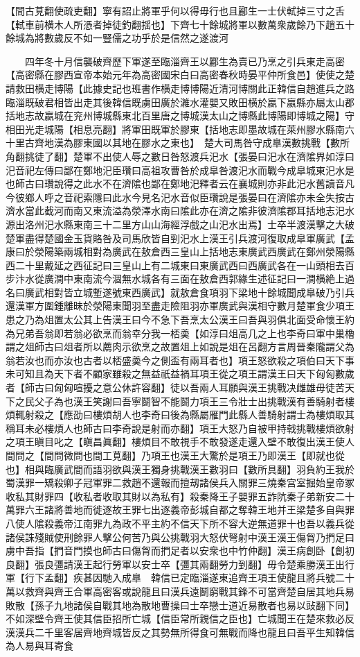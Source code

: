 【間古莧翻使疏吏翻】寧有詔止將軍乎何以得毋行也且酈生一士伏軾掉三寸之舌【軾車前横木人所憑者掉徒釣翻揺也】下齊七十餘城將軍以數萬衆歲餘乃下趙五十餘城為將數歲反不如一豎儒之功乎於是信然之遂渡河

　　四年冬十月信襲破齊歷下軍遂至臨淄齊王以酈生為賣已乃烹之引兵東走高密【高密縣在膠西宣帝本始元年為高密國宋白曰高密春秋時晏平仲所食邑】使使之楚請救田横走博陽【此據史記也班書作横走博博陽近清河博關此正韓信自趙進兵之路臨淄既破君相皆出走其後韓信既虜田廣於濰水灌嬰又敗田横於嬴下嬴縣亦屬太山郡括地志故嬴城在兖州博城縣東北百里唐之博城漢太山之博縣此博陽即博城之陽】守相田光走城陽【相息亮翻】將軍田既軍於膠東【括地志即墨故城在萊州膠水縣南六十里古齊地漢為膠東國以其地在膠水之東也】　楚大司馬咎守成臯漢數挑戰【數所角翻挑徒了翻】楚軍不出使人辱之數日咎怒渡兵汜水【張晏曰汜水在濟隂界如淳曰汜音祀左傳曰鄙在鄭地汜臣瓚曰高祖攻曹咎於成臯咎渡汜水而戰今成臯城東汜水是也師古曰瓚說得之此水不在濟隂也鄙在鄭地汜釋者云在襄城則亦非此汜水舊讀音凡今彼鄉人呼之音祀索隱曰此水今見名汜水音似臣瓚說是張晏曰在濟隂亦未全失按古濟水當此截河而南又東流溢為滎澤水南曰隂此亦在濟之隂非彼濟隂郡耳括地志汜水源出洛州汜水縣東南三十二里方山山海經浮戲之山汜水出焉】士卒半渡漢擊之大破楚軍盡得楚國金玉貨賂咎及司馬欣皆自剄汜水上漢王引兵渡河復取成臯軍廣武【孟康曰於滎陽築兩城相對為廣武在敖倉西三皇山上括地志東廣武西廣武在鄭州滎陽縣西二十里戴延之西征記曰三皇山上有二城東曰東廣武西曰西廣武各在一山頭相去百步汴水從廣澗中東南流今涸無水城各有三面在敖倉西郭緣生述征記曰一澗横絶上過名曰廣武相對皆立城塹遂號東西廣武】就敖倉食項羽下梁地十餘城聞成臯破乃引兵還漢軍方圍鍾離昧於滎陽東聞羽至盡走險阻羽亦軍廣武與漢相守數月楚軍食少項王患之乃為俎置太公其上告漢王曰今不急下吾烹太公漢王曰吾與羽俱北面受命懷王約為兄弟吾翁即若翁必欲烹而翁幸分我一桮羮【如淳曰俎高几之上也李奇曰軍中巢櫓謂之俎師古曰俎者所以薦肉示欲烹之故置俎上如說是俎在呂翻方言周晉秦隴謂父為翁若汝也而亦汝也古者以桮盛羮今之側盃有兩耳者也】項王怒欲殺之項伯曰天下事未可知且為天下者不顧家雖殺之無益祇益禍耳項王從之項王謂漢王曰天下匈匈數歲者【師古曰匈匈喧擾之意公休許容翻】徒以吾兩人耳願與漢王挑戰决雌雄毋徒苦天下之民父子為也漢王笑謝曰吾寧鬬智不能鬬力項王三令壯士出挑戰漢有善騎射者樓煩輒射殺之【應劭曰樓煩胡人也李奇曰後為縣屬雁門此縣人善騎射謂士為樓煩取其稱耳未必樓煩人也師古曰李奇說是射而亦翻】項王大怒乃自被甲持戟挑戰樓煩欲射之項王瞋目叱之【瞋昌眞翻】樓煩目不敢視手不敢發遂走還入壁不敢復出漢王使人間問之【間問微問也間工莧翻】乃項王也漢王大驚於是項王乃即漢王【即就也從也】相與臨廣武間而語羽欲與漢王獨身挑戰漢王數羽曰【數所具翻】羽負約王我於蜀漢罪一矯殺卿子冠軍罪二救趙不還報而擅刼諸侯兵入關罪三燒秦宫室掘始皇帝冢收私其財罪四【收私者收取其財以為私有】殺秦降王子嬰罪五詐阬秦子弟新安二十萬罪六王諸將善地而徙逐故王罪七出逐義帝彭城自都之奪韓王地并王梁楚多自與罪八使人隂殺義帝江南罪九為政不平主約不信天下所不容大逆無道罪十也吾以義兵從諸侯誅殘賊使刑餘罪人擊公何苦乃與公挑戰羽大怒伏弩射中漢王漢王傷胷乃捫足曰虜中吾指【捫音門摸也師古曰傷胷而捫足者以安衆也中竹仲翻】漢王病創卧【創初良翻】張良彊請漢王起行勞軍以安士卒【彊其兩翻勞力到翻】毋令楚乘勝漢王出行軍【行下孟翻】疾甚因馳入成臯　韓信已定臨淄遂東追齊王項王使龍且將兵號二十萬以救齊與齊王合軍高密客或說龍且曰漢兵遠鬭窮戰其鋒不可當齊楚自居其地兵易敗散【孫子九地諸侯自戰其地為散地曹操曰士卒戀士道近易散者也易以䜴翻下同】不如深壁令齊王使其信臣招所亡城【信臣常所親信之臣也】亡城聞王在楚來救必反漢漢兵二千里客居齊地齊城皆反之其勢無所得食可無戰而降也龍且曰吾平生知韓信為人易與耳寄食